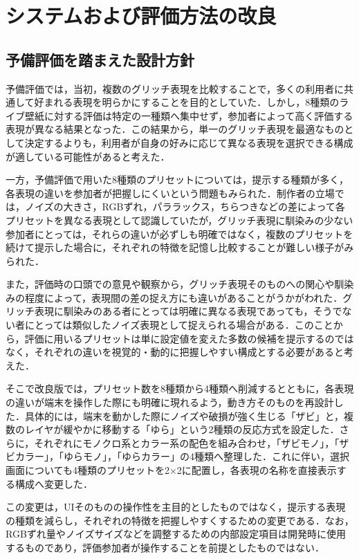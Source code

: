 \chapter{システムおよび評価方法の改良}

\section{予備評価を踏まえた設計方針}

予備評価では，当初，複数のグリッチ表現を比較することで，多くの利用者に共通して好まれる表現を明らかにすることを目的としていた．しかし，8種類のライブ壁紙に対する評価は特定の一種類へ集中せず，参加者によって高く評価する表現が異なる結果となった．この結果から，単一のグリッチ表現を最適なものとして決定するよりも，利用者が自身の好みに応じて異なる表現を選択できる構成が適している可能性があると考えた．

一方，予備評価で用いた8種類のプリセットについては，提示する種類が多く，各表現の違いを参加者が把握しにくいという問題もみられた．制作者の立場では，ノイズの大きさ，RGBずれ，パララックス，ちらつきなどの差によって各プリセットを異なる表現として認識していたが，グリッチ表現に馴染みの少ない参加者にとっては，それらの違いが必ずしも明確ではなく，複数のプリセットを続けて提示した場合に，それぞれの特徴を記憶し比較することが難しい様子がみられた．

また，評価時の口頭での意見や観察から，グリッチ表現そのものへの関心や馴染みの程度によって，表現間の差の捉え方にも違いがあることがうかがわれた．グリッチ表現に馴染みのある者にとっては明確に異なる表現であっても，そうでない者にとっては類似したノイズ表現として捉えられる場合がある．このことから，評価に用いるプリセットは単に設定値を変えた多数の候補を提示するのではなく，それぞれの違いを視覚的・動的に把握しやすい構成とする必要があると考えた．

そこで改良版では，プリセット数を8種類から4種類へ削減するとともに，各表現の違いが端末を操作した際にも明確に現れるよう，動き方そのものを再設計した．具体的には，端末を動かした際にノイズや破損が強く生じる「ザビ」と，複数のレイヤが緩やかに移動する「ゆら」という2種類の反応方式を設定した．さらに，それぞれにモノクロ系とカラー系の配色を組み合わせ，「ザビモノ」，「ザビカラー」，「ゆらモノ」，「ゆらカラー」の4種類へ整理した．これに伴い，選択画面についても4種類のプリセットを2×2に配置し，各表現の名称を直接表示する構成へ変更した．

この変更は，UIそのものの操作性を主目的としたものではなく，提示する表現の種類を減らし，それぞれの特徴を把握しやすくするための変更である．なお，RGBずれ量やノイズサイズなどを調整するための内部設定項目は開発時に使用するものであり，評価参加者が操作することを前提としたものではない．

